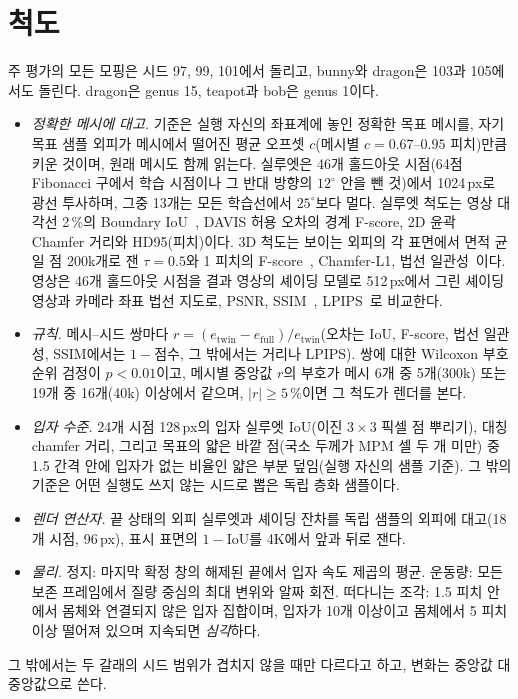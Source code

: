 \section{척도}
\label{app:ch4_measures_ko}
주 평가의 모든 모핑은 시드 97, 99, 101에서 돌리고, bunny와 dragon은 103과 105에서도 돌린다. dragon은 genus 15, teapot과
bob은 genus 1이다.
\begin{itemize}
  \item \emph{정확한 메시에 대고.} 기준은 실행 자신의 좌표계에 놓인 정확한 목표 메시를, 자기 목표 샘플 외피가 메시에서 떨어진
        평균 오프셋 $c$(메시별 $c=0.67$--$0.95$ 피치)만큼 키운 것이며, 원래 메시도 함께 읽는다. 실루엣은 46개 홀드아웃 시점(64점
        Fibonacci 구에서 학습 시점이나 그 반대 방향의 $12^\circ$ 안을 뺀 것)에서 1024\,px로 광선 투사하며, 그중 13개는 모든 학습선에서
        $25^\circ$보다 멀다. 실루엣 척도는 영상 대각선 2\,\%의 Boundary IoU~\citep{cheng2021boundaryiou}, DAVIS 허용 오차의 경계
        F-score, 2D 윤곽 Chamfer 거리와 HD95(피치)이다. 3D 척도는 보이는 외피의 각 표면에서 면적 균일 점 200k개로 잰 $\tau=0.5$와
        1 피치의 F-score~\citep{knapitsch2017tanks,tatarchenko2019singleview}, Chamfer-L1, 법선 일관성~\citep{mescheder2019occupancy}이다.
        영상은 46개 홀드아웃 시점을 결과 영상의 셰이딩 모델로 512\,px에서 그린 셰이딩 영상과 카메라 좌표 법선 지도로,
        PSNR, SSIM~\citep{wang2004ssim}, LPIPS~\citep{zhang2018lpips}로 비교한다.
  \item \emph{규칙.} 메시--시드 쌍마다 $r=(e_{\mathrm{twin}}-e_{\mathrm{full}})/e_{\mathrm{twin}}$(오차는 IoU, F-score, 법선 일관성,
        SSIM에서는 $1-$점수, 그 밖에서는 거리나 LPIPS). 쌍에 대한 Wilcoxon 부호 순위 검정이 $p<0.01$이고, 메시별 중앙값 $r$의
        부호가 메시 6개 중 5개(300k) 또는 19개 중 16개(40k) 이상에서 같으며, $\lvert r\rvert\geq5\,\%$이면 그 척도가 렌더를 본다.
  \item \emph{입자 수준.} 24개 시점 128\,px의 입자 실루엣 IoU(이진 $3\times3$ 픽셀 점 뿌리기), 대칭 chamfer 거리, 그리고 목표의
        얇은 바깥 점(국소 두께가 MPM 셀 두 개 미만) 중 1.5 간격 안에 입자가 없는 비율인 얇은 부분 덮임(실행 자신의 샘플 기준).
        그 밖의 기준은 어떤 실행도 쓰지 않는 시드로 뽑은 독립 층화 샘플이다.
  \item \emph{렌더 연산자.} 끝 상태의 외피 실루엣과 셰이딩 잔차를 독립 샘플의 외피에 대고(18개 시점, 96\,px), 표시 표면의
        $1-\mathrm{IoU}$를 4K에서 앞과 뒤로 잰다.
  \item \emph{물리.} 정지: 마지막 확정 창의 해제된 끝에서 입자 속도 제곱의 평균. 운동량: 모든 보존 프레임에서 질량 중심의
        최대 변위와 알짜 회전. 떠다니는 조각: 1.5 피치 안에서 몸체와 연결되지 않은 입자 집합이며, 입자가 10개 이상이고 몸체에서
        5 피치 이상 떨어져 있으며 지속되면 \emph{심각}하다.
\end{itemize}
그 밖에서는 두 갈래의 시드 범위가 겹치지 않을 때만 다르다고 하고, 변화는 중앙값 대 중앙값으로 쓴다.

